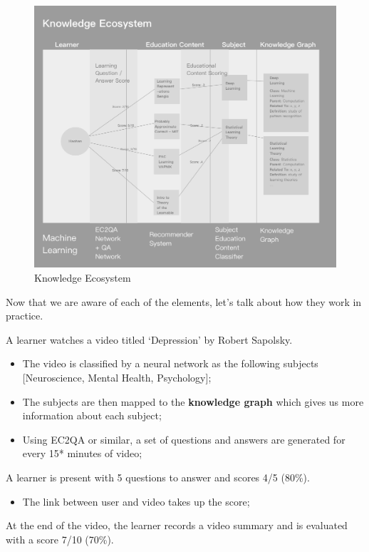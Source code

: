 \documentclass{acm_proc_article-sp}
\providecommand{\tightlist}{%
  \setlength{\itemsep}{0pt}\setlength{\parskip}{0pt}}
\begin{document}
\begin{figure}
\centering
\includegraphics{img/knowledgeEcosystem.png}
\caption{Knowledge Ecosystem}
\end{figure}

Now that we are aware of each of the elements, let's talk about how they
work in practice.

A learner watches a video titled `Depression' by Robert Sapolsky.

\begin{itemize}
\item
  The video is classified by a neural network as the following subjects
  {[}Neuroscience, Mental Health, Psychology{]};
\item
  The subjects are then mapped to the \textbf{knowledge graph} which
  gives us more information about each subject;
\item
  Using EC2QA or similar, a set of questions and answers are generated
  for every 15* minutes of video;
\end{itemize}

A learner is present with 5 questions to answer and scores 4/5 (80\%).

\begin{itemize}
\tightlist
\item
  The link between user and video takes up the score;
\end{itemize}

At the end of the video, the learner records a video summary and is
evaluated with a score 7/10 (70\%).
\end{document}
